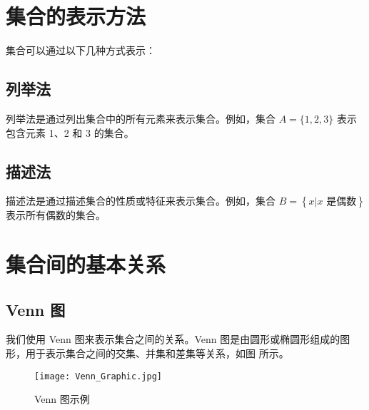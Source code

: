\documentclass[lang = zh , final , oneside , openany , titlepage , zihao = -4 , linespread = 1.3 , baselineskip = false , cjk-font = macOS , text-font = newtx , math-font = newtx]{sjtureport}
\begin{document}
\section{集合的表示方法}

集合可以通过以下几种方式表示：

\subsection{列举法}
列举法是通过列出集合中的所有元素来表示集合。例如，集合 $A = \{1, 2, 3\}$ 表示包含元素 1、2 和 3 的集合。

\subsection{描述法}

描述法是通过描述集合的性质或特征来表示集合。例如，集合 $B = \left\{x \vert x \text{ 是偶数}\right\}$ 表示所有偶数的集合。

\section{集合间的基本关系}

\subsection{Venn 图}

我们使用 Venn 图来表示集合之间的关系。Venn 图是由圆形或椭圆形组成的图形，用于表示集合之间的交集、并集和差集等关系，如图  所示。

\begin{figure}[htbp]
    \centering
    \texttt{[image: Venn\_Graphic.jpg]}
    \caption{Venn 图示例}
    \label{fig:venn_diagram}
\end{figure}

%
\end{document}
